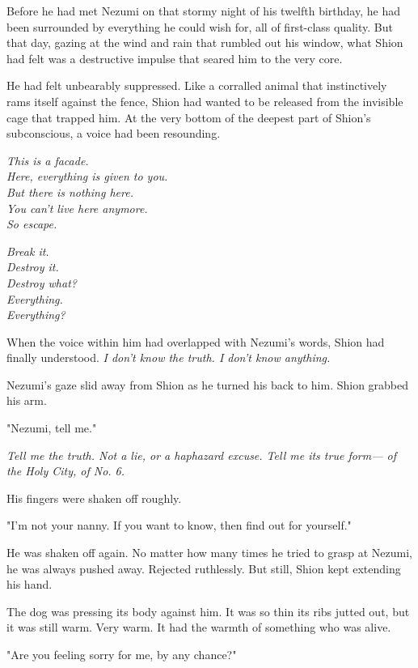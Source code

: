 Before he had met Nezumi on that stormy night of his twelfth birthday,
he had been surrounded by everything he could wish for, all of
first-class quality. But that day, gazing at the wind and rain that
rumbled out his window, what Shion had felt was a destructive impulse
that seared him to the very core.

He had felt unbearably suppressed. Like a corralled animal that
instinctively rams itself against the fence, Shion had wanted to be
released from the invisible cage that trapped him. At the very bottom of
the deepest part of Shion's subconscious, a voice had been resounding.

\myspace

\emph{This is a facade.\\
	Here, everything is given to you.\\
	But there is nothing here.\\
	You can't live here anymore.\\
	So escape.}

\myspace

\emph{Break it.\\
	Destroy it.\\
	Destroy what?\\
	Everything.\\
	Everything?}

\myspace

When the voice within him had overlapped with Nezumi's words, Shion had
finally understood. \emph{I don't know the truth. I don't know anything.}

Nezumi's gaze slid away from Shion as he turned his back to him. Shion
grabbed his arm.

"Nezumi, tell me."

\emph{Tell me the truth. Not a lie, or a haphazard excuse. Tell me its true
form--- of the Holy City, of No. 6.}

His fingers were shaken off roughly.

"I'm not your nanny. If you want to know, then find out for yourself."

He was shaken off again. No matter how many times he tried to grasp at
Nezumi, he was always pushed away. Rejected ruthlessly. But still, Shion
kept extending his hand.

The dog was pressing its body against him. It was so thin its ribs
jutted out, but it was still warm. Very warm. It had the warmth of
something who was alive.

"Are you feeling sorry for me, by any chance?"

